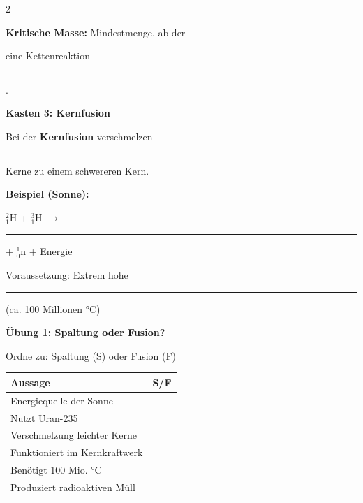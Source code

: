 \documentclass[10pt, a4paper]{article}
\newcommand{\fachfarbe}{physik}
\newcommand{\luecke}[1]{\rule{#1}{0.4pt}}
\newcommand{\abschnitt}[1]{%
    \vspace{8pt}\noindent\textbf{\textcolor{\fachfarbe}{#1}}\vspace{4pt}
}
\begin{document}
\begin{multicols}{2}
\begin{merksatz}
\vspace{6pt}

\textbf{Kritische Masse:} Mindestmenge, ab der

eine Kettenreaktion \luecke{2.5cm}.
\end{merksatz}

\vspace{6pt}


\abschnitt{Kasten 3: Kernfusion}

\begin{merksatz}
Bei der \textbf{Kernfusion} verschmelzen

\luecke{2cm} Kerne zu einem schwereren Kern.

\vspace{6pt}

\textbf{Beispiel (Sonne):}

$^{2}_{1}$H + $^{3}_{1}$H $\rightarrow$ \luecke{1.5cm} + $^{1}_{0}$n + Energie

\vspace{6pt}

Voraussetzung: Extrem hohe \luecke{2cm}

(ca. 100 Millionen °C)
\end{merksatz}

\columnbreak


\abschnitt{Übung 1: Spaltung oder Fusion?}

Ordne zu: Spaltung (S) oder Fusion (F)

\vspace{4pt}
\begin{tabular}{|p{4.5cm}|c|}
\hline
\textbf{Aussage} & \textbf{S/F} \\
\hline
Energiequelle der Sonne & \\
\hline
Nutzt Uran-235 & \\
\hline
Verschmelzung leichter Kerne & \\
\hline
Funktioniert im Kernkraftwerk & \\
\hline
Benötigt 100 Mio. °C & \\
\hline
Produziert radioaktiven Müll & \\
\hline
\end{tabular}


\end{multicols}
\end{document}
